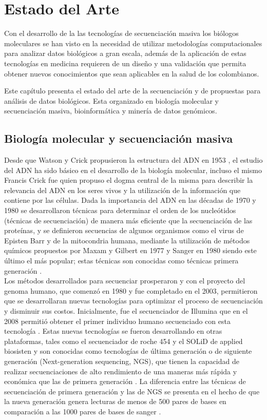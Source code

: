 \chapter{Estado del Arte}

Con el desarrollo de la las tecnologías de secuenciación masiva los biólogos moleculares se han visto en la necesidad  de utilizar metodologías computacionales para analizar datos biológicos a gran escala, además de la aplicación de estas tecnologías en medicina requieren de un diseño y una validación que permita obtener nuevos conocimientos que sean  aplicables en la salud de los colombianos.

Este capítulo presenta el estado del arte de la secuenciación y de propuestas para análisis de datos biológicos. Esta organizado en biología molecular y secuenciación masiva, bioinformática y  minería de datos genómicos.  

\section{Biología molecular y secuenciación masiva}

Desde  que  Watson y Crick propusieron la estructura del ADN en 1953 \cite{Watson1953}, el estudio del ADN ha sido básico en el desarrollo de la biología molecular, incluso el mismo Francis Crick fue quien propuso el dogma central de la misma para describir la relevancia del ADN en los seres vivos y la utilización de la información que contiene por las células. Dada la importancia del  ADN  en las décadas de 1970 y 1980 se desarrollaron  técnicas para determinar el orden de los nucleótidos  (técnicas de secuenciación) de manera más eficiente que la secuenciación de las proteínas, y se definieron secuencias de algunos organismos como el virus de Episten Barr y  de la mitocondria humana, mediante la utilización de métodos químicos propuestos por Maxam y Gilbert en 1977 y Sanger en 1980 siendo este último el más popular; estas técnicas son conocidas como técnicas primera generación \cite{Herraez2012}. \\

Los métodos desarrollados para secuenciar prosperaron y con el proyecto del genoma humano, que comenzó en 1980 y fue completado en el 2003, permitieron que se desarrollaran nuevas tecnologías para optimizar el proceso de secuenciación y disminuir sus costos. Inicialmente, fue el secuenciador de Illumina  que en el 2008 permitió obtener el primer individuo humano secuenciado con esta tecnología \cite{Pei}. Estas nuevas tecnologías se fueron desarrollando en otras plataformas, tales como el secuenciador de roche 454 y el SOLiD de applied biosisten \cite{Pei} y son conocidas como tecnologías de última generación o de siguiente generación (Next-generation sequencing, NGS), que tienen la capacidad de realizar secuenciaciones de alto rendimiento de una maneras más rápida y económica que las de primera generación \cite{Herraez2012}. La diferencia entre las técnicas de secuenciación de primera generación y las de NGS se presenta en el hecho de que la nueva generación genera lecturas de menos de 500 pares de bases en comparación a las 1000 pares de bases de sanger \cite{Pei,Kulski2016}. \\
 
